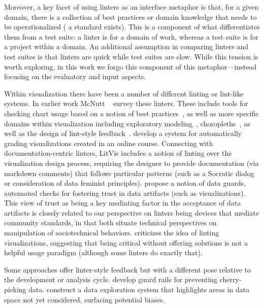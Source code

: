 Moreover, a key facet of using linters as an interface metaphor is that, for a given domain, there is a collection of best practices or domain knowledge that needs to be operationalized (\ie{} a standard exists). This is a component of what differentiates them from a test suite: a linter is for a domain of work, whereas a test suite is for a project within a domain.
An additional assumption in comparing linters and test suites is that linters are quick while test suites are slow.
While this tension is worth exploring, in this work we forgo this component of this metaphor---instead focusing on the evaluatory and input aspects.



Within visualization there have been a number of different linting or lint-like systems.
In earlier work McNutt \etal{}~\cite{mcnutt2024mixing} survey these linters.
These include tools for checking chart usage based on a notion of best practices~\cite{mcnutt2018linting, zheng2019visualization, ChartLinter}, as well as more specific domains within visualization including exploratory modeling~\cite{kale2023evm}, choropleths~\cite{lei2023geolinter}, as well as the design of lint-style feedback~\cite{hopkins2020visualint}.
\citet{hull2023visgrader} develop a system for automatically grading visualizations created in an online course.
Connecting with documentation-centric linters, LitVis \cite{wood2018design} includes a notion of linting over the visualization design process, requiring the designer to provide documentation (via markdown comments) that follows particular patterns (such as a Socratic dialog or consideration of data feminist principles).
\citet{sultanum2024data} propose a notion of data guards, automated checks for fostering trust in data artifacts (such as visualizations). This view of trust as being a key mediating factor in the acceptance of data artifacts is closely related to our perspective on linters being devices that mediate community standards, in that both situate technical perspectives on manipulation of sociotechnical behaviors.
\citet{kosara24Boring} criticizes the idea of linting visualizations, suggesting that being critical without offering solutions is not a helpful usage paradigm (although some linters do exactly that).



Some approaches offer linter-style feedback but with a different pose relative to the development or analysis cycle.
\citet{lisnicvisualization} develop guard rails for preventing cherry-picking data.
\citet{narechania2021lumos} construct a data exploration system that highlights areas in data space not yet considered, surfacing potential biases.

